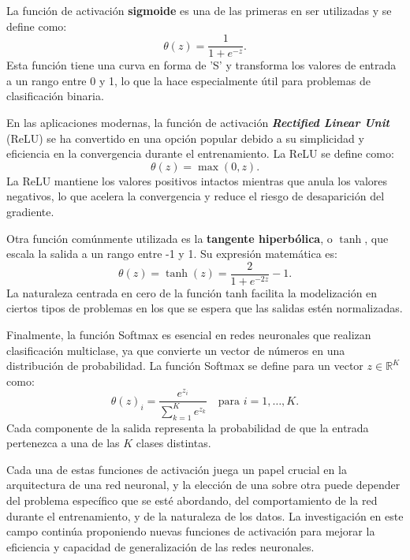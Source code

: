La función de activación \textbf{sigmoide} es una de las primeras en ser utilizadas y se define como:
\begin{equation}
	\theta(z) = \frac{1}{1 + e^{-z}}.
\end{equation}
Esta función tiene una curva en forma de 'S' y transforma los valores de entrada a un rango entre 0 y 1, lo que la hace especialmente útil para problemas de clasificación binaria.

En las aplicaciones modernas, la función de activación \textbf{\textit{Rectified Linear Unit}} (ReLU) se ha convertido en una opción popular debido a su simplicidad y eficiencia en la convergencia durante el entrenamiento. La ReLU se define como:
\begin{equation}
	\theta(z) = \max(0, z).
\end{equation}
La ReLU mantiene los valores positivos intactos mientras que anula los valores negativos, lo que acelera la convergencia y reduce el riesgo de desaparición del gradiente.

Otra función comúnmente utilizada es la \textbf{tangente hiperbólica}, o $\tanh$, que escala la salida a un rango entre -1 y 1. Su expresión matemática es:
\begin{equation}
	\theta(z) = \tanh(z) = \frac{2}{1 + e^{-2z}} - 1.
\end{equation}
La naturaleza centrada en cero de la función tanh facilita la modelización en ciertos tipos de problemas en los que se espera que las salidas estén normalizadas.

Finalmente, la función Softmax es esencial en redes neuronales que realizan clasificación multiclase, ya que convierte un vector de números en una distribución de probabilidad. La función Softmax se define para un vector $z \in \mathbb{R}^K$ como:
\begin{equation}
	\theta(z)_i = \frac{e^{z_i}}{\sum_{k=1}^K e^{z_k}} \quad \text{para } i = 1, \ldots, K.
\end{equation}
Cada componente de la salida representa la probabilidad de que la entrada pertenezca a una de las $K$ clases distintas.

Cada una de estas funciones de activación juega un papel crucial en la arquitectura de una red neuronal, y la elección de una sobre otra puede depender del problema específico que se esté abordando, del comportamiento de la red durante el entrenamiento, y de la naturaleza de los datos. La investigación en este campo continúa proponiendo nuevas funciones de activación para mejorar la eficiencia y capacidad de generalización de las redes neuronales.

